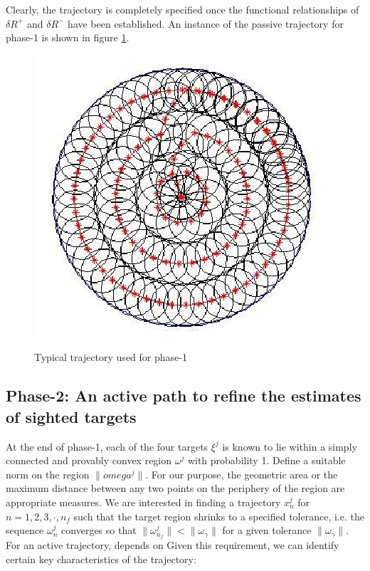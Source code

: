 Clearly, the trajectory is completely specified once the functional relationships of $\delta R^+$ and $\delta R^-$ have been established. An instance of the passive trajectory for phase-1 is shown in figure \ref{fig_mission_phase1_c}.

\begin{figure}
\centering
\includegraphics[scale=1]{Figures/mission_phase1_c}
\label{fig_mission_phase1_c}
\caption{Typical trajectory used for phase-1}
\end{figure}


\subsection{Phase-2: An active path to refine the estimates of sighted targets}

At the end of phase-1, each of the four targets $\xi^j$ is known to lie within a simply connected and provably convex region $\omega^j$ with probability 1. Define a suitable norm on the region $\| omega^j\|$. For our purpose, the geometric area or the maximum distance between any two points on the periphery of the region are appropriate measures. We are interested in finding a trajectory $x^j_n$ for $n=1,2,3, \cdot , n_f$ such that the target region shrinks to a specified tolerance, i.e. the sequence $\omega_n^j$ converges so that $\| \omega^j_{n_f} \| < \| \omega_\gamma \|$  for a given tolerance $\| \omega_\gamma \|$. For an active trajectory,  depends on  Given this requirement, we can identify certain key characteristics of the trajectory:

